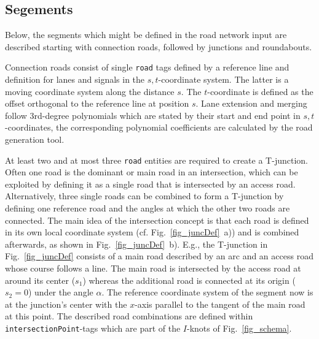 \documentclass[a4paper, 10pt, conference]{ieeeconf}      %
\begin{document}
\subsection{Segements}\label{sec_segments}
Below, the segments which might be defined in the road network input are described starting with connection roads, followed by junctions and roundabouts.

Connection roads consist of single \texttt{road} tags defined by a reference line and definition for lanes and signals in the $s,t$-coordinate system. The latter is a moving coordinate system along the distance $s$. The $t$-coordinate is defined as the offset orthogonal to the reference line at position $s$. Lane extension and merging follow 3rd-degree polynomials which are stated by their start and end point in $s,t$-coordinates, the corresponding polynomial coefficients are calculated by the road generation tool.

At least two and at most three \texttt{road} entities are required to create a T-junction. Often one road is the dominant or main road in an intersection, which can be exploited by defining it as a single road that is intersected by an access road. Alternatively, three single roads can be combined to form a T-junction by defining one reference road and the angles at which the other two roads are connected. The main idea of the intersection concept is that each road is defined in its own local coordinate system (cf. Fig.~\ref{fig_juncDef}~a)) and is combined afterwards, as shown in Fig.~\ref{fig_juncDef}~b). E.g., the T-junction in Fig.~\ref{fig_juncDef} consists of a main road described by an arc and an access road whose course follows a line. The main road is intersected by the access road at around its center ($s_1$) whereas the additional road is connected at its origin ($s_2=0$) under the angle $\alpha$. The reference coordinate system of the segment now is at the junction's center with the $x$-axis parallel to the tangent of the main road at this point. The described road combinations are defined within \texttt{intersectionPoint}-tags which are part of the $I$-knots of Fig.~\ref{fig_schema}.
\end{document}
